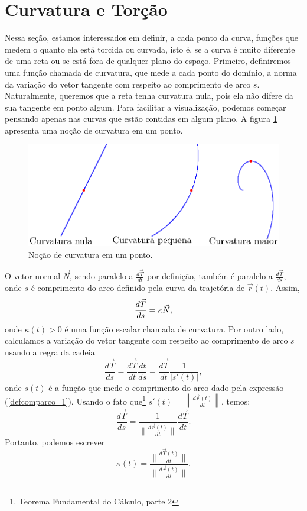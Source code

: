 \section{Curvatura e Torção}

Nessa seção, estamos interessados em definir, a cada ponto da curva, funções que medem o quanto ela está torcida ou curvada, isto é, se a curva é muito diferente de uma reta ou se está fora de qualquer plano do espaço. Primeiro, definiremos uma função chamada de curvatura, que mede a cada ponto do domínio, a norma da variação do vetor tangente com respeito ao comprimento de arco $s$. Naturalmente, queremos que a reta tenha curvatura nula, pois ela não difere da sua tangente em ponto algum. Para facilitar a visualização, podemos começar pensando apenas nas curvas que estão contidas em algum plano. A figura \ref{curvatura} apresenta uma noção de curvatura em um ponto.


\begin{figure}
\begin{center}
    \includegraphics{./cap_curvas/figs/exemplos_de_curvatura2}
 \caption{Noção de curvatura em um ponto.\label{curvatura}}
  \end{center}
\end{figure}

O vetor normal $\vec{N}$,  sendo paralelo a $\frac{d\vec{T}}{dt}$ por definição, também é paralelo a $\frac{d\vec{T}}{ds}$, onde $s$ é comprimento do arco definido pela curva da trajetória de $\vec{r}(t)$. Assim, 
\begin{equation}{\label{Frenet_1}}
\frac{d \vec{T} }{ds}=\kappa   \vec{N},
\end{equation}
onde $\kappa(t)>0$ é uma função escalar chamada de curvatura. Por outro lado, calculamos a variação do vetor tangente com respeito ao comprimento de arco $s$ usando a regra da cadeia
$$
\frac{d \vec{T} }{ds}=\frac{d \vec{T} }{dt}\frac{dt}{ds}=\frac{d \vec{T} }{dt}\frac{1}{|s'(t)|},
$$
onde $s(t)$ é a função que mede o comprimento do arco dado pela expressão (\ref{defcomparco_1}). Usando o fato que\footnote{Teorema Fundamental do Cálculo, parte 2} $s'(t)=\left\|\frac{d\vec{r}(t)}{dt}\right\|$, temos:
$$
\frac{d \vec{T} }{ds}=\frac{1}{\|\frac{d\vec{r}(t)}{dt} \|}\frac{d \vec{T} }{dt}.
$$
Portanto, podemos escrever
$$
\kappa(t)=\frac{\|\frac{d\vec{T}(t)}{dt}\|}{\|\frac{d\vec{r}(t)}{dt}\|}.
$$

